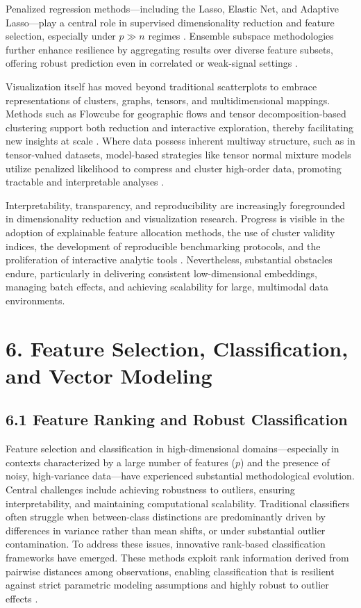 \documentclass[11pt]{article}
\begin{document}
Penalized regression methods—including the Lasso, Elastic Net, and Adaptive Lasso—play a central role in supervised dimensionality reduction and feature selection, especially under \(p \gg n\) regimes \cite{ref101}. Ensemble subspace methodologies further enhance resilience by aggregating results over diverse feature subsets, offering robust prediction even in correlated or weak-signal settings \cite{ref116}.

Visualization itself has moved beyond traditional scatterplots to embrace representations of clusters, graphs, tensors, and multidimensional mappings. Methods such as Flowcube for geographic flows and tensor decomposition-based clustering support both reduction and interactive exploration, thereby facilitating new insights at scale \cite{ref53,ref58,ref79,ref86,ref91,ref92,ref94,ref95,ref99}. Where data possess inherent multiway structure, such as in tensor-valued datasets, model-based strategies like tensor normal mixture models utilize penalized likelihood to compress and cluster high-order data, promoting tractable and interpretable analyses \cite{ref92}.

Interpretability, transparency, and reproducibility are increasingly foregrounded in dimensionality reduction and visualization research. Progress is visible in the adoption of explainable feature allocation methods, the use of cluster validity indices, the development of reproducible benchmarking protocols, and the proliferation of interactive analytic tools \cite{ref53,ref79,ref90,ref92,ref96,ref99}. Nevertheless, substantial obstacles endure, particularly in delivering consistent low-dimensional embeddings, managing batch effects, and achieving scalability for large, multimodal data environments.

\section{6. Feature Selection, Classification, and Vector Modeling}

\subsection{6.1 Feature Ranking and Robust Classification}

Feature selection and classification in high-dimensional domains—especially in contexts characterized by a large number of features ($p$) and the presence of noisy, high-variance data—have experienced substantial methodological evolution. Central challenges include achieving robustness to outliers, ensuring interpretability, and maintaining computational scalability. Traditional classifiers often struggle when between-class distinctions are predominantly driven by differences in variance rather than mean shifts, or under substantial outlier contamination. To address these issues, innovative rank-based classification frameworks have emerged. These methods exploit rank information derived from pairwise distances among observations, enabling classification that is resilient against strict parametric modeling assumptions and highly robust to outlier effects \cite{ref102}.
\end{document}
